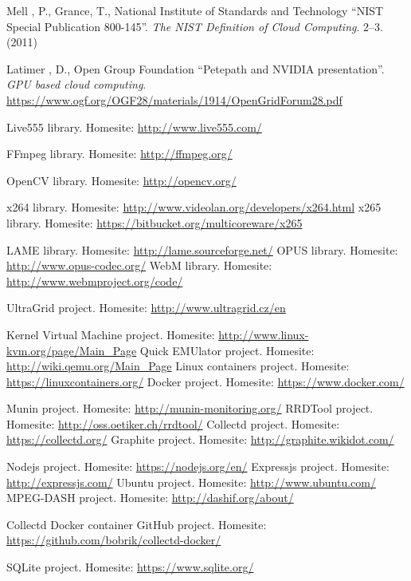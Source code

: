 \documentclass[english,final]{setup/eetac_tfc_pfc}
\begin{document}
\begin{thebibliography}{2}
Mell , P., Grance, T., National Institute of Standards and Technology
``NIST Special Publication 800-145''. {\it The NIST Definition of Cloud Computing}.
2--3. (2011) 

Latimer , D., Open Group Foundation
``Petepath and NVIDIA presentation''. {\it GPU based cloud computing}.
\url{https://www.ogf.org/OGF28/materials/1914/OpenGridForum28.pdf}

Live555 library. Homesite: \url{http://www.live555.com/}

FFmpeg library. Homesite: \url{http://ffmpeg.org/}

OpenCV library. Homesite: \url{http://opencv.org/}

x264 library. Homesite: \url{http://www.videolan.org/developers/x264.html}
x265 library. Homesite: \url{https://bitbucket.org/multicoreware/x265}

LAME library. Homesite: \url{http://lame.sourceforge.net/}
OPUS library. Homesite: \url{http://www.opus-codec.org/}
WebM library. Homesite: \url{http://www.webmproject.org/code/}

UltraGrid project. Homesite: \url{http://www.ultragrid.cz/en}

Kernel Virtual Machine project. Homesite: \url{http://www.linux-kvm.org/page/Main_Page}
Quick EMUlator project. Homesite: \url{http://wiki.qemu.org/Main_Page}
Linux containers project. Homesite: \url{https://linuxcontainers.org/}
Docker project. Homesite: \url{https://www.docker.com/}

Munin project. Homesite: \url{http://munin-monitoring.org/}
RRDTool project. Homesite: \url{http://oss.oetiker.ch/rrdtool/}
Collectd project. Homesite: \url{https://collectd.org/}
Graphite project. Homesite: \url{http://graphite.wikidot.com/}

Nodejs project. Homesite: \url{https://nodejs.org/en/}
Expressjs project. Homesite: \url{http://expressjs.com/}
Ubuntu project. Homesite: \url{http://www.ubuntu.com/}
MPEG-DASH project. Homesite: \url{http://dashif.org/about/}

Collectd Docker container GitHub project. Homesite: \url{https://github.com/bobrik/collectd-docker/}

SQLite project. Homesite: \url{https://www.sqlite.org/}



\end{thebibliography}
\pagestyle{empty}  %
\end{document}

